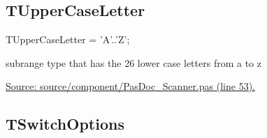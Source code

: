 \documentclass{report}
\newif\ifpdf
\begin{document}
\subsection*{TUpperCaseLetter}
\fi
\label{PasDoc_Scanner-TUpperCaseLetter}
\begin{list}{}{
\setlength{\itemindent}{0cm}
\setlength{\listparindent}{0cm}
\setlength{\leftmargin}{\evensidemargin}
\addtolength{\leftmargin}{\tmplength}
\settowidth{\labelsep}{X}
\addtolength{\leftmargin}{\labelsep}
\setlength{\labelwidth}{\tmplength}
}
\item[\textbf{Declaration}\hfill]
\ifpdf
\begin{flushleft}
\fi
\begin{ttfamily}
TUpperCaseLetter = 'A'..'Z';\end{ttfamily}

\ifpdf
\end{flushleft}
\fi

\par
\item[\textbf{Description}]
subrange type that has the 26 lower case letters from a to z\par
\href{https://github.com/pasdoc/pasdoc/blob/master/source/component/PasDoc_Scanner.pas#L53}{Source: source/component/PasDoc{\_}Scanner.pas (line 53).}

\end{list}
\ifpdf
\subsection*{\large{\textbf{TSwitchOptions}}\normalsize\hspace{1ex}\hrulefill}
\else
\end{document}
